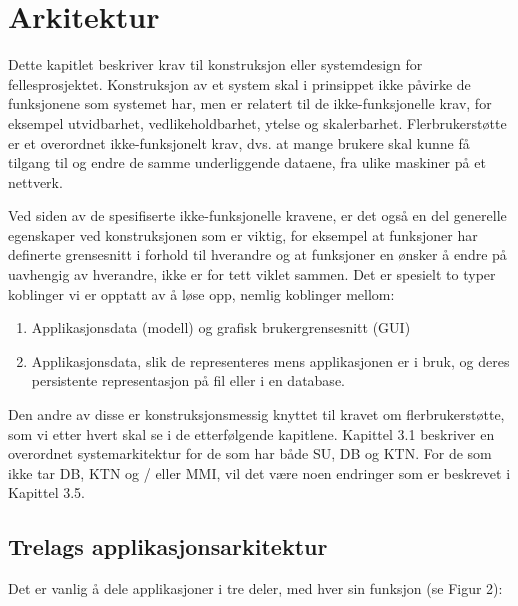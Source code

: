 \section{Arkitektur}
Dette kapitlet beskriver krav til konstruksjon eller systemdesign for fellesprosjektet. Konstruksjon av et system skal i prinsippet ikke påvirke de funksjonene som systemet har, men er relatert til de ikke-funksjonelle krav, for eksempel utvidbarhet, vedlikeholdbarhet, ytelse og skalerbarhet. Flerbrukerstøtte er et overordnet ikke-funksjonelt krav, dvs. at mange brukere skal kunne få tilgang til og endre de samme underliggende dataene, fra ulike maskiner på et nettverk.

Ved siden av de spesifiserte ikke-funksjonelle kravene, er det også en del generelle egenskaper ved konstruksjonen som er viktig, for eksempel at funksjoner har definerte grensesnitt i forhold til hverandre og at funksjoner en ønsker å endre på uavhengig av hverandre, ikke er for tett viklet sammen. Det er spesielt to typer koblinger vi er opptatt av å løse opp, nemlig koblinger mellom:

\begin{enumerate}

\item
Applikasjonsdata (modell) og grafisk brukergrensesnitt (GUI)

\item
Applikasjonsdata, slik de representeres mens applikasjonen er i bruk, og deres persistente representasjon på fil eller i en database. 

\end{enumerate}

Den andre av disse er konstruksjonsmessig knyttet til kravet om flerbrukerstøtte, som vi etter hvert skal se i de etterfølgende kapitlene. Kapittel 3.1 beskriver en overordnet systemarkitektur for de som har både SU, DB og KTN. For de som ikke tar DB, KTN og / eller MMI, vil det være noen endringer som er beskrevet i Kapittel 3.5.

\subsection{Trelags applikasjonsarkitektur}

Det er vanlig å dele applikasjoner i tre deler, med hver sin funksjon (se Figur 2):


